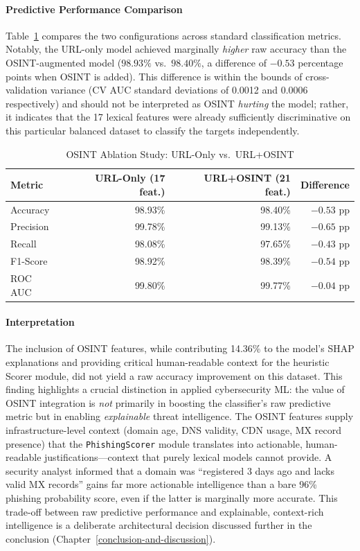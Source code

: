\paragraph{Predictive Performance Comparison}

Table~\ref{tab:ablation} compares the two configurations across standard
classification metrics. Notably, the URL-only model achieved marginally
\emph{higher} raw accuracy than the OSINT-augmented model
($98.93\%$ vs.\ $98.40\%$, a difference of $-0.53$ percentage points
when OSINT is added). This difference is within the bounds of
cross-validation variance (CV AUC standard deviations of 0.0012 and
0.0006 respectively) and should not be interpreted as OSINT
\emph{hurting} the model; rather, it indicates that the 17 lexical
features were already sufficiently discriminative on this particular
balanced dataset to classify the targets independently.

\begin{table}[htbp]
\centering
\caption{OSINT Ablation Study: URL-Only vs.\ URL+OSINT}
\label{tab:ablation}
\renewcommand{\arraystretch}{1.3}
\begin{tabular}{@{}lrrr@{}}
\toprule
\textbf{Metric} & \textbf{URL-Only (17 feat.)} & \textbf{URL+OSINT (21 feat.)} & \textbf{Difference} \\
\midrule
Accuracy & 98.93\% & 98.40\% & $-0.53$ pp \\
Precision & 99.78\% & 99.13\% & $-0.65$ pp \\
Recall & 98.08\% & 97.65\% & $-0.43$ pp \\
F1-Score & 98.92\% & 98.39\% & $-0.54$ pp \\
ROC AUC & 99.80\% & 99.77\% & $-0.04$ pp \\
\bottomrule
\end{tabular}
\end{table}

\paragraph{Interpretation}

The inclusion of OSINT features, while contributing 14.36\% to the
model's SHAP explanations and providing critical human-readable context
for the heuristic Scorer module, did not yield a raw accuracy
improvement on this dataset. This finding highlights a crucial
distinction in applied cybersecurity ML: the value of OSINT integration
is \emph{not} primarily in boosting the classifier's raw predictive
metric but in enabling \emph{explainable} threat intelligence. The OSINT
features supply infrastructure-level context (domain age, DNS validity,
CDN usage, MX record presence) that the \texttt{PhishingScorer} module
translates into actionable, human-readable justifications---context that
purely lexical models cannot provide. A security analyst informed that a
domain was ``registered 3 days ago and lacks valid MX records'' gains
far more actionable intelligence than a bare 96\% phishing probability
score, even if the latter is marginally more accurate. This trade-off
between raw predictive performance and explainable, context-rich
intelligence is a deliberate architectural decision discussed further in
the conclusion (Chapter~\ref{conclusion-and-discussion}).

